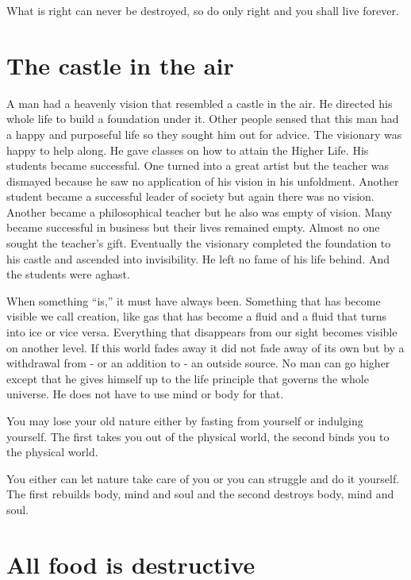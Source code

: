 \documentclass[12pt,letterpaper]{article}
\begin{document}
What is right can never be destroyed, so do only right and you shall
live forever.


\section{The castle in the air}
\label{sec:tcita}

A man had a heavenly vision that resembled a castle in the air. He
directed his whole life to build a foundation under it. Other people
sensed that this man had a happy and purposeful life so they sought
him out for advice. The visionary was happy to help along. He gave
classes on how to attain the Higher Life. His students became
successful. One turned into a great artist but the teacher was
dismayed because he saw no application of his vision in his
unfoldment. Another student became a successful leader of society but
again there was no vision. Another became a philosophical teacher but
he also was empty of vision. Many became successful in business but
their lives remained empty. Almost no one sought the teacher's
gift. Eventually the visionary completed the foundation to his castle
and ascended into invisibility. He left no fame of his life
behind. And the students were aghast.

When something ``is,'' it must have always been. Something that has
become visible we call creation, like gas that has become a fluid and
a fluid that turns into ice or vice versa. Everything that disappears
from our sight becomes visible on another level. If this world fades
away it did not fade away of its own but by a withdrawal from - or an
addition to - an outside source. No man can go higher except that he
gives himself up to the life principle that governs the whole
universe. He does not have to use mind or body for that.

You may lose your old nature either by fasting from yourself or
indulging yourself. The first takes you out of the physical world, the
second binds you to the physical world.

You either can let nature take care of you or you can struggle and do
it yourself. The first rebuilds body, mind and soul and the second
destroys body, mind and soul.


\section{All food is destructive}
\label{sec:afid}
\end{document}
